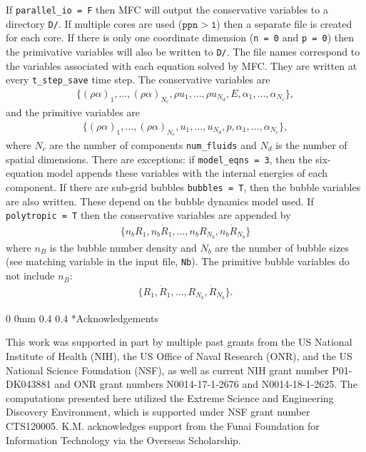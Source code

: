 \documentclass[11pt]{article}
\makeatletter
\newcommand{\Rdot}{\dot{R}}
\renewcommand{\section}{\@startsection
{section}%
{0}%
{0mm}%
{0.4\baselineskip}%
{0.4\baselineskip}%
{\normalfont\Large\bfseries\color{myBrown}}}%
\makeatother
\begin{document}
If \texttt{parallel\_io = F} then MFC will output the conservative variables to a directory \texttt{D/}. 
If multiple cores are used ($\mathtt{ppn > 1}$) then a separate file is created for each core.
If there is only one coordinate dimension (\texttt{n = 0} and \texttt{p = 0}) then the primivative variables will also be written to \texttt{D/}.
The file names correspond to the variables associated with each equation solved by MFC.
They are written at every \texttt{t\_step\_save} time step.
The conservative variables are
\begin{gather}
    \{ (\rho \alpha)_1, \dots, (\rho\alpha)_{N_c}, \rho u_1, \dots, \rho u_{N_d}, E, \alpha_1, \dots, \alpha_{N_c} \},
\end{gather}
and the primitive variables are
\begin{gather}
    \{ (\rho \alpha)_1, \dots, (\rho\alpha)_{N_c}, u_1, \dots, u_{N_d}, p, \alpha_1, \dots, \alpha_{N_c} \},
\end{gather}
where $N_c$ are the number of components \texttt{num\_fluids} and $N_d$ is the number of spatial dimensions. 
There are exceptions: if \texttt{model\_eqns = 3}, then the six-equation model appends these variables with the internal energies of each component.
If there are sub-grid bubbles \texttt{bubbles = T}, then the bubble variables are also written. 
These depend on the bubble dynamics model used.
If \texttt{polytropic = T} then the conservative variables are appended by 
\begin{gather}
    \{ n_b R_1, n_b \Rdot_1, \dots, n_b R_{N_b}, n_b \Rdot_{N_b} \}
\end{gather}
where $n_B$ is the bubble number density and $N_b$ are the number of bubble sizes (see matching variable in the input file, \texttt{Nb}).
The primitive bubble variables do not include $n_B$:
\begin{gather}
    \{ R_1, \Rdot_1, \dots, R_{N_b}, \Rdot_{N_b} \}.
\end{gather}

\newpage
\section*{Acknowledgements} 

This work was supported in part by multiple past grants from the US National Institute of Health (NIH), the US Office of Naval Research (ONR), and the US National Science Foundation (NSF), as well as current NIH grant number P01-DK043881 and ONR grant numbers N0014-17-1-2676 and N0014-18-1-2625.
The computations presented here utilized the Extreme Science and Engineering Discovery Environment, which is supported under NSF grant number CTS120005.
K.M. acknowledges support from the Funai Foundation for Information Technology via the Overseas Scholarship.
\end{document}
